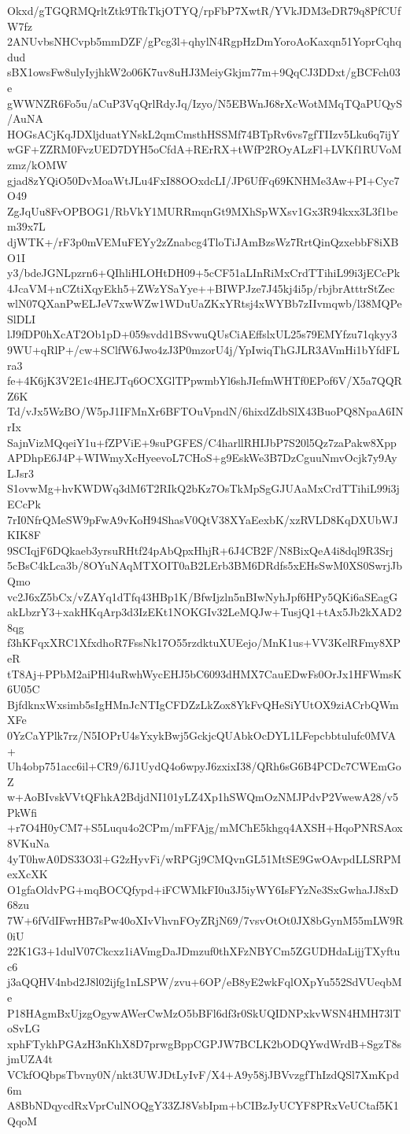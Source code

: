 Okxd/gTGQRMQrltZtk9TfkTkjOTYQ/rpFbP7XwtR/YVkJDM3eDR79q8PfCUfW7fz
2ANUvbsNHCvpb5mmDZF/gPcg3l+qhylN4RgpHzDmYoroAoKaxqn51YoprCqhqdud
sBX1owsFw8ulyIyjhkW2o06K7uv8uHJ3MeiyGkjm77m+9QqCJ3DDxt/gBCFch03e
gWWNZR6Fo5u/aCuP3VqQrlRdyJq/Izyo/N5EBWnJ68rXcWotMMqTQaPUQyS/AuNA
HOGsACjKqJDXljduatYNskL2qmCmsthHSSMf74BTpRv6vs7gfTIIzv5Lku6q7ijY
wGF+ZZRM0FvzUED7DYH5oCfdA+RErRX+tWfP2ROyALzFl+LVKf1RUVoMzmz/kOMW
gjad8zYQiO50DvMoaWtJLu4FxI88OOxdcLI/JP6UfFq69KNHMe3Aw+PI+Cyc7O49
ZgJqUu8FvOPBOG1/RbVkY1MURRmqnGt9MXhSpWXsv1Gx3R94kxx3L3f1bem39x7L
djWTK+/rF3p0mVEMuFEYy2zZnabcg4TloTiJAmBzsWz7RrtQinQzxebbF8iXBO1I
y3/bdeJGNLpzrn6+QIhliHLOHtDH09+5cCF51aLInRiMxCrdTTihiL99i3jECcPk
4JcaVM+nCZtiXqyEkh5+ZWzYSaYye++BIWPJze7J45kj4i5p/rbjbrAtttrStZec
wlN07QXanPwELJeV7xwWZw1WDuUaZKxYRtsj4xWYBb7zIIvmqwb/l38MQPeSlDLI
lJ9fDP0hXcAT2Ob1pD+059svdd1BSvwuQUsCiAEffslxUL25s79EMYfzu71qkyy3
9WU+qRlP+/cw+SClfW6Jwo4zJ3P0mzorU4j/YpIwiqThGJLR3AVmHi1bYfdFLra3
fe+4K6jK3V2E1c4HEJTq6OCXGlTPpwmbYl6shJIefmWHTf0EPof6V/X5a7QQRZ6K
Td/vJx5WzBO/W5pJ1IFMnXr6BFTOuVpndN/6hixdZdbSlX43BuoPQ8NpaA6INrIx
SajnVizMQqeiY1u+fZPViE+9suPGFES/C4harllRHIJbP7S20l5Qz7zaPakw8Xpp
APDhpE6J4P+WIWmyXcHyeevoL7CHoS+g9EskWe3B7DzCguuNmvOcjk7y9AyLJsr3
S1ovwMg+hvKWDWq3dM6T2RIkQ2bKz7OsTkMpSgGJUAaMxCrdTTihiL99i3jECcPk
7rI0NfrQMeSW9pFwA9vKoH94ShasV0QtV38XYaEexbK/xzRVLD8KqDXUbWJKIK8F
9SCIqjF6DQkaeb3yrsuRHtf24pAbQpxHhjR+6J4CB2F/N8BixQeA4i8dql9R3Srj
5cBsC4kLca3b/8OYuNAqMTXOIT0aB2LErb3BM6DRdfs5xEHsSwM0XS0SwrjJbQmo
vc2J6xZ5bCx/vZAYq1dTfq43HBp1K/BfwIjzln5nBIwNyhJpf6HPy5QKi6aSEagG
akLbzrY3+xakHKqArp3d3IzEKt1NOKGIv32LeMQJw+TusjQ1+tAx5Jb2kXAD28qg
f3hKFqxXRC1XfxdhoR7FssNk17O55rzdktuXUEejo/MnK1us+VV3KelRFmy8XPeR
tT8Aj+PPbM2aiPHl4uRwhWycEHJ5bC6093dHMX7CauEDwFs0OrJx1HFWmsK6U05C
BjfdknxWxsimb5sIgHMnJcNTIgCFDZzLkZox8YkFvQHeSiYUtOX9ziACrbQWmXFe
0YzCaYPlk7rz/N5IOPrU4sYxykBwj5GckjcQUAbkOcDYL1LFepcbbtulufc0MVA+
Uh4obp751acc6il+CR9/6J1UydQ4o6wpyJ6zxixI38/QRh6sG6B4PCDc7CWEmGoZ
w+AoBIvskVVtQFhkA2BdjdNI101yLZ4Xp1hSWQmOzNMJPdvP2VwewA28/v5PkWfi
+r7O4H0yCM7+S5Luqu4o2CPm/mFFAjg/mMChE5khgq4AXSH+HqoPNRSAox8VKuNa
4yT0hwA0DS33O3l+G2zHyvFi/wRPGj9CMQvnGL51MtSE9GwOAvpdLLSRPMexXcXK
O1gfaOldvPG+mqBOCQfypd+iFCWMkFI0u3J5iyWY6IsFYzNe3SxGwhaJJ8xD68zu
7W+6fVdIFwrHB7sPw40oXIvVhvnFOyZRjN69/7vsvOtOt0JX8bGynM55mLW9R0iU
22K1G3+1dulV07Ckcxz1iAVmgDaJDmzuf0thXFzNBYCm5ZGUDHdaLijjTXyftuc6
j3aQQHV4nbd2J8l02ijfg1nLSPW/zvu+6OP/eB8yE2wkFqlOXpYu552SdVUeqbMe
P18HAgmBxUjzgOgywAWerCwMzO5bBFl6df3r0SkUQIDNPxkvWSN4HMH73lToSvLG
xphFTykhPGAzH3nKhX8D7prwgBppCGPJW7BCLK2bODQYwdWrdB+SgzT8sjmUZA4t
VCkfOQbpsTbvny0N/nkt3UWJDtLyIvF/X4+A9y58jJBVvzgfThIzdQSl7XmKpd6m
A8BbNDqycdRxVprCulNOQgY33ZJ8VsbIpm+bCIBzJyUCYF8PRxVeUCtaf5K1QqoM
